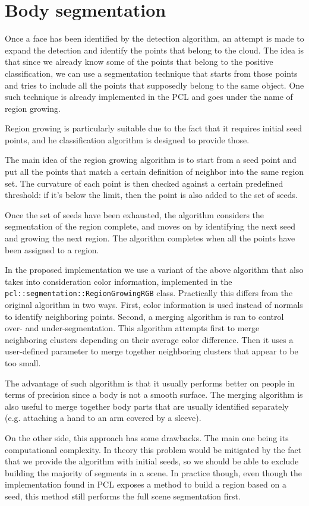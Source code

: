 \documentclass[a4paper,11pt,titlepage]{article}
\begin{document}
\section{Body segmentation}
Once a face has been identified by the detection algorithm, an attempt is made
to expand the detection and identify the points that belong to the cloud. The
idea is that since we already know some of the points that belong to the
positive classification, we can use a segmentation technique that starts from
those points and tries to include all the points that supposedly belong to the
same object. One such technique is already implemented in the PCL and goes under
the name of region growing.

Region growing is particularly suitable due to the fact that it requires initial
seed points, and he classification algorithm is designed to provide those.

The main idea of the region growing algorithm is to start from a seed point and
put all the points that match a certain definition of neighbor into the same
region set. The curvature of each point is then checked against a certain
predefined threshold: if it's below the limit, then the point is also added to
the set of seeds.

Once the set of seeds have been exhausted, the algorithm considers the
segmentation of the region complete, and moves on by identifying the next seed
and growing the next region. The algorithm completes when all the points have
been assigned to a region.

In the proposed implementation we use a variant of the above algorithm that
also takes into consideration color information, implemented in the
\texttt{pcl::segmentation::RegionGrowingRGB} class. Practically this differs
from the original algorithm in two ways. First, color information is used
instead of normals to identify neighboring points. Second, a merging algorithm
is ran to control over- and under-segmentation. This algorithm attempts first to
merge neighboring clusters depending on their average color difference. Then it
uses a user-defined parameter to merge together neighboring clusters that appear
to be too small.

The advantage of such algorithm is that it usually performs better on people in
terms of precision since a body is not a smooth surface. The merging algorithm
is also useful to merge together body parts that are usually identified
separately (e.g. attaching a hand to an arm covered by a sleeve).

On the other side, this approach has some drawbacks. The main one being its
computational complexity. In theory this problem would be mitigated by the fact
that we provide the algorithm with initial seeds, so we should be able to
exclude building the majority of segments in a scene. In practice though, even
though the implementation found in PCL exposes a method to build a region based
on a seed, this method still performs the full scene segmentation first.
\end{document}

